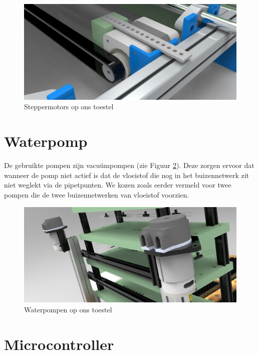 \documentclass[a4paper,twoside,kulak]{kulakreport} %
\begin{document}
\begin{figure}
	\centering
	\includegraphics[width=1\textwidth]{fotomotor.jpg}
	\caption{Steppermotors op ons toestel}
	\label{fig: steppermotor}
	
\end{figure} 

\section{Waterpomp}

De gebruikte pompen zijn vacuümpompen (zie Figuur \ref{fig: waterpomp}). Deze zorgen ervoor dat wanneer de pomp niet actief is dat de vloeistof die nog in het buizennetwerk zit niet weglekt via de pipetpunten. We kozen zoals eerder vermeld voor twee pompen die de twee buizennetwerken van vloeistof voorzien. 

\begin{figure}
	\centering
	\includegraphics[width=1\textwidth]{fotopomp.jpg}
	\caption{Waterpompen op ons toestel}
	\label{fig: waterpomp}
	
\end{figure} 

\section{Microcontroller}
\end{document}
